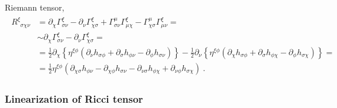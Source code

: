 \documentclass[letterpaper,10pt,english]{jupyterBook}
\begin{document}
\sphinxAtStartPar
Riemann tensor,
\begin{equation*}
\begin{split}\begin{aligned}
  R^{\xi}_{\ \ \sigma \chi \nu}
  & = \partial_{\chi} \Gamma_{\sigma \nu}^{\xi} - \partial_{\nu} \Gamma_{\chi \sigma}^{\xi} + \Gamma_{\sigma \nu}^{\mu} \Gamma_{\mu \chi}^{\xi} - \Gamma_{\chi \sigma}^{\mu} \Gamma_{\mu \nu}^{\xi} = \\
  & \sim \partial_{\chi} \Gamma_{\sigma \nu}^{\xi} - \partial_{\nu} \Gamma_{\chi \sigma}^{\xi} = \\
  & = \frac{1}{2} \partial_{\chi} \left\{ \eta^{\xi \phi} \left( \partial_\nu h_{\sigma \phi} + \partial_\sigma h_{\phi \nu} - \partial_{\phi} h_{\sigma \nu} \right) \right\}
    - \frac{1}{2} \partial_{\nu } \left\{ \eta^{\xi \phi} \left( \partial_\chi h_{\sigma \phi} + \partial_\sigma h_{\phi \chi} - \partial_{\phi} h_{\sigma \chi} \right) \right\} = \\
  & = \frac{1}{2} \eta^{\xi \phi} \left( \partial_{\chi \sigma} h_{\phi \nu} - \partial_{\chi \phi} h_{\sigma \nu} - \partial_{\nu \sigma} h_{\phi \chi} + \partial_{\nu \phi} h_{\sigma \chi} \right) \ .
\end{aligned}\end{split}
\end{equation*}\subsubsection*{Linearization of Ricci tensor}
\end{document}
